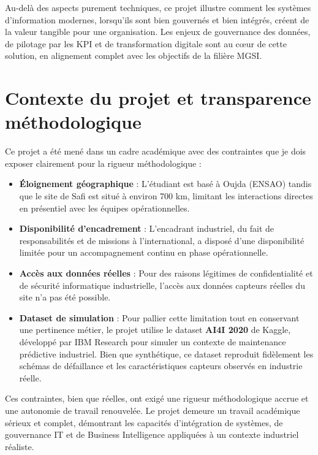 \documentclass[a4paper,12pt,twoside]{report}
\begin{document}
Au-delà des aspects purement techniques, ce projet illustre comment les systèmes d'information modernes, lorsqu'ils sont bien gouvernés et bien intégrés, créent de la valeur tangible pour une organisation. Les enjeux de gouvernance des données, de pilotage par les KPI et de transformation digitale sont au cœur de cette solution, en alignement complet avec les objectifs de la filière MGSI.

\section*{Contexte du projet et transparence méthodologique}

Ce projet a été mené dans un cadre académique avec des contraintes que je dois exposer clairement pour la rigueur méthodologique :

\begin{itemize}
    \item \textbf{Éloignement géographique} : L'étudiant est basé à Oujda (ENSAO) tandis que le site de Safi est situé à environ 700 km, limitant les interactions directes en présentiel avec les équipes opérationnelles.
    
    \item \textbf{Disponibilité d'encadrement} : L'encadrant industriel, du fait de responsabilités et de missions à l'international, a disposé d'une disponibilité limitée pour un accompagnement continu en phase opérationnelle.
    
    \item \textbf{Accès aux données réelles} : Pour des raisons légitimes de confidentialité et de sécurité informatique industrielle, l'accès aux données capteurs réelles du site n'a pas été possible.
    
    \item \textbf{Dataset de simulation} : Pour pallier cette limitation tout en conservant une pertinence métier, le projet utilise le dataset \textbf{AI4I 2020} de Kaggle, développé par IBM Research pour simuler un contexte de maintenance prédictive industriel. Bien que synthétique, ce dataset reproduit fidèlement les schémas de défaillance et les caractéristiques capteurs observés en industrie réelle.
\end{itemize}

Ces contraintes, bien que réelles, ont exigé une rigueur méthodologique accrue et une autonomie de travail renouvelée. Le projet demeure un travail académique sérieux et complet, démontrant les capacités d'intégration de systèmes, de gouvernance IT et de Business Intelligence appliquées à un contexte industriel réaliste.
\end{document}
